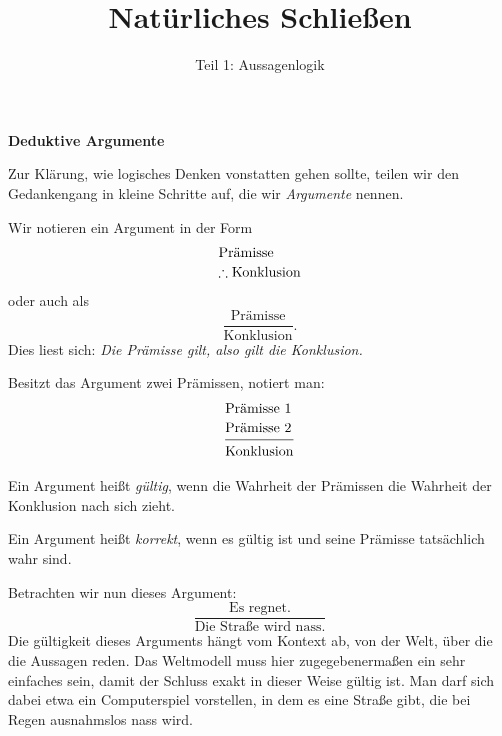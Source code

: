\documentclass[8pt]{beamer}
\title{Natürliches Schließen}
\subtitle{Teil 1: Aussagenlogik}
\date{}
\newcommand{\inferrulewidth}{0.4608pt}
\newcommand{\hla}[1]{{\color{chla}#1}}
\newcommand{\hlb}[1]{{\color{chlb}#1}}
\newcommand{\hlg}[1]{{\color{chlg}#1}}
\newcommand{\hlh}[1]{{\color{chlh}#1}}
\newcommand{\strong}[1]{\textsf{\textbf{#1}}}
\newcommand{\centerheadline}[1]{%
  \begin{center}\strong{#1}\end{center}}
\newcommand{\parspace}{\vspace{0.8em}}
\begin{document}
\begin{frame}
\maketitle
\end{frame}


\begin{frame}
\centerheadline{Deduktive Argumente}
\end{frame}

\begin{frame}
Zur Klärung, wie logisches Denken vonstatten gehen sollte, teilen
wir den Gedankengang in kleine Schritte auf, die wir \emph{Argumente}
nennen.\pause

\parspace
Wir notieren ein Argument in der Form
\[\begin{array}{@{}l@{}}
\text{Prämisse}\\[2pt]
\therefore\text{Konklusion}\end{array}\]
oder auch als
\[\dfrac{\text{Prämisse}}{\text{Konklusion}}.\]
Dies liest sich: \emph{Die Prämisse gilt, also gilt die Konklusion.}\pause

\parspace
Besitzt das Argument zwei Prämissen, notiert man:
\[\begin{array}{@{}l@{}}
\text{Prämisse 1}\\[2pt]
\text{Prämisse 2}\\
\midrule[\inferrulewidth]
\text{Konklusion}
\end{array}\]
\end{frame}

\begin{frame}
Ein Argument heißt \emph{gültig}, wenn die Wahrheit der Prämissen die
Wahrheit der Konklusion nach sich zieht.

\parspace
Ein Argument heißt \emph{korrekt}, wenn es gültig ist und seine
Prämisse tatsächlich wahr sind.\pause

\parspace
Betrachten wir nun dieses Argument:
\[\frac{\text{Es regnet.}}{\text{Die Straße wird nass.}}\]
Die gültigkeit dieses Arguments hängt vom Kontext ab, von der Welt, über
die die Aussagen reden. Das Weltmodell muss hier zugegebenermaßen ein sehr
einfaches sein, damit der Schluss exakt in dieser Weise gültig ist.
Man darf sich dabei etwa ein Computerspiel vorstellen, in dem es eine Straße
gibt, die bei Regen ausnahmslos nass wird.
\end{frame}
\end{document}
